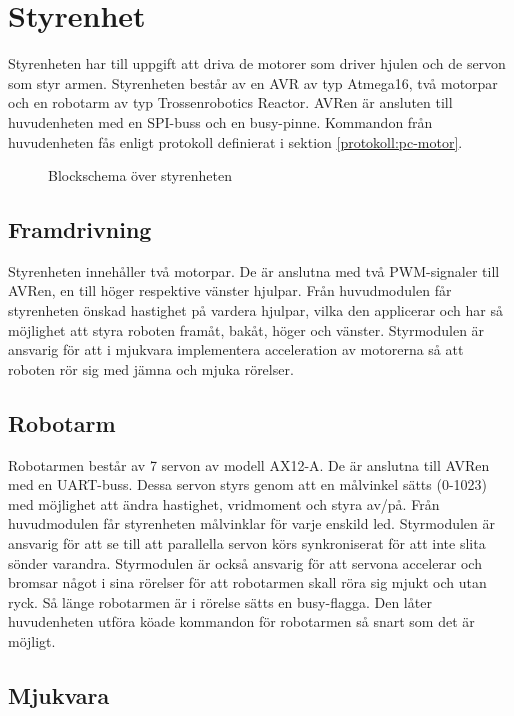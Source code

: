 \section{Styrenhet}
Styrenheten har till uppgift att driva de motorer som driver hjulen och de servon som styr armen. Styrenheten består av en AVR av typ Atmega16, två motorpar och en robotarm av typ Trossenrobotics Reactor. AVRen är ansluten till huvudenheten med en SPI-buss och en busy-pinne. Kommandon från huvudenheten fås enligt protokoll definierat i sektion \ref{protokoll:pc-motor}. 

\begin{figure}[H]
\center

\caption{Blockschema över styrenheten}
\end{figure}

\subsection{Framdrivning}

Styrenheten innehåller två motorpar. De är anslutna med två PWM-signaler till AVRen, en till höger respektive vänster hjulpar. Från huvudmodulen får styrenheten önskad hastighet på vardera hjulpar, vilka den applicerar och har så möjlighet att styra roboten framåt, bakåt, höger och vänster. Styrmodulen är ansvarig för att i mjukvara implementera acceleration av motorerna så att roboten rör sig med jämna och mjuka rörelser.

\subsection{Robotarm}

Robotarmen består av 7 servon av modell AX12-A. De är anslutna till AVRen med en UART-buss. Dessa servon styrs genom att en målvinkel sätts (0-1023) med möjlighet att ändra hastighet, vridmoment och styra av/på. Från huvudmodulen får styrenheten målvinklar för varje enskild led. Styrmodulen är ansvarig för att se till att parallella servon körs synkroniserat för att inte slita sönder varandra. Styrmodulen är också ansvarig för att servona accelerar och bromsar något i sina rörelser för att robotarmen skall röra sig mjukt och utan ryck. Så länge robotarmen är i rörelse sätts en busy-flagga. Den låter huvudenheten utföra köade kommandon för robotarmen så snart som det är möjligt. 

\subsection{Mjukvara}

